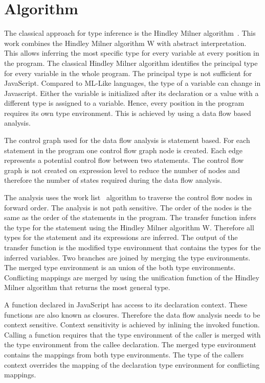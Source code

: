 \section{Algorithm}
The classical approach for type inference is the Hindley Milner algorithm~\cite{Milner1978}. This work combines the Hindley Milner algorithm W with abstract interpretation. This allows inferring the most specific type for every variable at every position in the program. The classical Hindley Milner algorithm identifies the principal type for every variable in the whole program. The principal type is not sufficient for JavaScript. Compared to ML-Like languages, the type of a variable can change in Javascript. Either the variable is initialized after its declaration or a value with a different type is assigned to a variable. Hence, every position in the program requires its own type environment. This is achieved by using a data flow based analysis. 

The control graph used for the data flow analysis is statement based. For each statement in the program one control flow graph node is created. Each edge represents a potential control flow between two statements. The control flow graph is not created on expression level to reduce the number of nodes and therefore the number of states required during the data flow analysis.  

The analysis uses the work list~\cite{NielsonNielsonHankin1999} algorithm to traverse the control flow nodes in forward order. The analysis is not path sensitive. The order of the nodes is the same as the order of the statements in the program. The transfer function infers the type for the statement using the Hindley Milner algorithm W. Therefore all types for the statement and its expressions are inferred. The output of the transfer function is the modified type environment that contains the types for the inferred variables. Two branches are joined by merging the type environments. The merged type environment is an union of the both type environments. Conflicting mappings are merged by using the unification function of the Hindley Milner algorithm that returns the most general type.

A function declared in JavaScript has access to its declaration context. These functions are also known as closures. Therefore the data flow analysis needs to be context sensitive. Context sensitivity is achieved by inlining the invoked function. Calling a function requires that the type environment of the caller is merged with the type environment from the callee declaration. The merged type environment contains the mappings from both type environments. The type of the callers context overrides the mapping of the declaration type environment for conflicting mappings. 